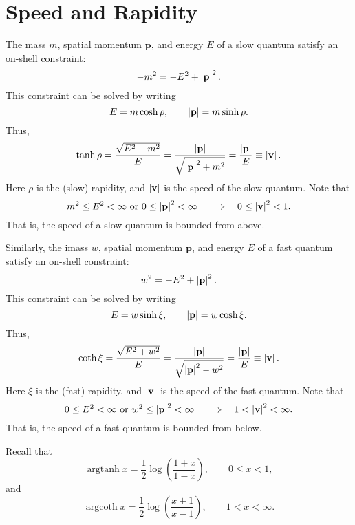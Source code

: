 \section{Speed and Rapidity}
The mass $m$, spatial momentum $\mathbf{p}$, and energy $E$ of a slow quantum satisfy an on-shell constraint:
\begin{equation}
	{-m^{2}} = {-E^{2}} + \left\lvert \mathbf{p} \right\rvert^{2}.
\end{equation}
This constraint can be solved by writing
\begin{equation}
	E = m \operatorname{cosh}{\rho}, \qquad \left\lvert \mathbf{p} \right\rvert = m \operatorname{sinh}{\rho}.
\end{equation}
Thus,
\begin{equation}
	\operatorname{tanh}{\rho} = \frac{\sqrt{E^{2} - m^{2}}}{E} = \frac{\left\lvert \mathbf{p} \right\rvert}{\sqrt{\left\lvert \mathbf{p} \right\rvert^{2} + m^{2}}} = \frac{\left\lvert \mathbf{p} \right\rvert}{E} \equiv \left\lvert \mathbf{v} \right\rvert.
\end{equation}
Here $\rho$ is the (slow) rapidity, and $\left\lvert \mathbf{v} \right\rvert$ is the speed of the slow quantum. Note that
\begin{equation}
	m^{2} \leq E^{2} < \infty \text{ or } 0 \leq \left\lvert \mathbf{p} \right\rvert^{2} < \infty \quad \Longrightarrow \quad 0 \leq \left\lvert \mathbf{v} \right\rvert^{2} < 1.
\end{equation}
That is, the speed of a slow quantum is bounded from above.

Similarly, the imass $w$, spatial momentum $\mathbf{p}$, and energy $E$ of a fast quantum satisfy an on-shell constraint:
\begin{equation}
	{w^{2}} = {-E^{2}} + \left\lvert \mathbf{p} \right\rvert^{2}.
\end{equation}
This constraint can be solved by writing
\begin{equation}
	E = w \operatorname{sinh}{\xi}, \qquad \left\lvert \mathbf{p} \right\rvert = w \operatorname{cosh}{\xi}.
\end{equation}
Thus,
\begin{equation}
	\operatorname{coth}{\xi} = \frac{\sqrt{E^{2} + w^{2}}}{E} = \frac{\left\lvert \mathbf{p} \right\rvert}{\sqrt{\left\lvert \mathbf{p} \right\rvert^{2} - w^{2}}} = \frac{\left\lvert \mathbf{p} \right\rvert}{E} \equiv \left\lvert \mathbf{v} \right\rvert.
\end{equation}
Here $\xi$ is the (fast) rapidity, and $\left\lvert \mathbf{v} \right\rvert$ is the speed of the fast quantum. Note that
\begin{equation}
	0 \leq E^{2} < \infty \text{ or } w^{2} \leq \left\lvert \mathbf{p} \right\rvert^{2} < \infty \quad \Longrightarrow \quad 1 < \left\lvert \mathbf{v} \right\rvert^{2} < \infty.
\end{equation}
That is, the speed of a fast quantum is bounded from below.

Recall that
\begin{equation}
	\operatorname{argtanh}{x} = \frac{1}{2} \log{\left( \frac{1 + x}{1 - x} \right)}, \qquad 0 \leq x < 1,
\end{equation}
and
\begin{equation}
	\operatorname{argcoth}{x} = \frac{1}{2} \log{\left( \frac{x + 1}{x - 1} \right)}, \qquad 1 < x < \infty.
\end{equation}